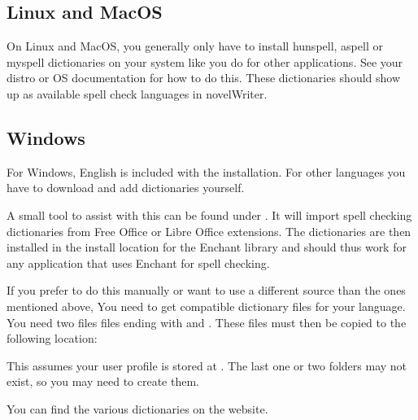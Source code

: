 \documentclass[a4paper,11pt,english]{sphinxmanual}
\begin{document}
\subsection{Linux and MacOS}
\label{\detokenize{more_customise:linux-and-macos}}
\sphinxAtStartPar
On Linux and MacOS, you generally only have to install hunspell, aspell or myspell dictionaries on
your system like you do for other applications. See your distro or OS documentation for how to do
this. These dictionaries should show up as available spell check languages in novelWriter.


\subsection{Windows}
\label{\detokenize{more_customise:windows}}
\sphinxAtStartPar
For Windows, English is included with the installation. For other languages you have to download
and add dictionaries yourself.

\sphinxAtStartPar
{}

\sphinxAtStartPar
A small tool to assist with this can be found under . It will import
spell checking dictionaries from Free Office or Libre Office extensions. The dictionaries are then
installed in the install location for the Enchant library and should thus work for any application
that uses Enchant for spell checking.

\sphinxAtStartPar
{}

\sphinxAtStartPar
If you prefer to do this manually or want to use a different source than the ones mentioned above,
You need to get compatible dictionary files for your language. You need two files files ending with
 and . These files must then be copied to the following location:

\sphinxAtStartPar
{}

\sphinxAtStartPar
This assumes your user profile is stored at . The last one or two folders may
not exist, so you may need to create them.

\sphinxAtStartPar
You can find the various dictionaries on the  website.
\end{document}
